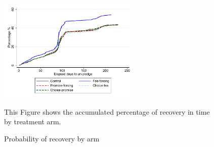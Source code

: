 \documentclass[oneside,11pt]{article}
\begin{document}
\begin{figure}[H]
        \caption{Probability of recovery by arm}
    \label{survival_graph}
    \begin{center}
        \centering
        \includegraphics[width=0.60\textwidth]{Figuras/survival_graph_unpledge.pdf}
    \end{center}
     \scriptsize  This Figure shows the accumulated percentage of recovery in time by treatment arm. 
\end{figure}










\end{document}
